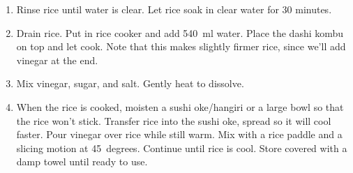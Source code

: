 \serves{}
\makes{}

\begin{ingredients}
\end{ingredients}


\begin{recipe}
  \begin{enumerate}

  \item Rinse rice until water is clear.  Let rice soak in clear water for 30 minutes.
    
  \item Drain rice.  Put in rice cooker and add 540~ml water.  Place
    the dashi kombu on top and let cook.  Note that this makes
    slightly firmer rice, since we'll add vinegar at the end.

  \item Mix vinegar, sugar, and salt.  Gently heat to dissolve.
    
  \item When the rice is cooked, moisten a sushi oke/hangiri or a
    large bowl so that the rice won't stick.  Transfer rice into the
    sushi oke, spread so it will cool faster.  Pour vinegar over rice
    while still warm.  Mix with a rice paddle and a slicing motion at
    45~degrees.  Continue until rice is cool.  Store covered with a
    damp towel until ready to use.

  \end{enumerate}
\end{recipe}

